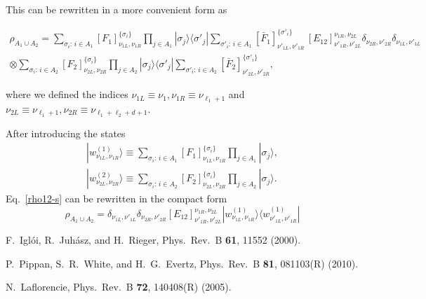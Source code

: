 \documentclass[twocolumn,superscriptaddress,prb,10pt]{revtex4-1}
\begin{document}
%
This can be rewritten in a more convenient form as 
%
\begin{widetext}
\begin{multline}
\label{rho12-s}
\rho_{A_1\cup A_2}=\sum_{\sigma_i:\, i\in A_1}
[F_1]^{\{\sigma_i\}}_{\nu_{1L},\nu_{1R}}\prod_{j\in A_1}|\sigma_j\rangle
\langle\sigma'_j|\sum_{\sigma'_i:\, i\in A_1}
[\bar F_1]^{\{\sigma'_i\}}_{\nu'_{1L},\nu'_{1R}}\,
[E_{12}]^{\nu_{1R},\nu_{2L}}_{\nu'_{1R},\nu'_{2L}}
\delta_{\nu_{2R},
\nu'_{2R}}\delta_{\nu_{1L},\nu'_{1L}}
\\\otimes\sum_{\sigma_i:\, i\in A_2}
[F_2]^{\{\sigma_{i}\}}_{\nu_{2L},
\nu_{2R}}\prod_{j\in A_2}|\sigma_j\rangle\langle\sigma'_j|
\sum_{\sigma'_i:\, i\in A_2}
[\bar F_2]^{\{\sigma'_i\}}_{\nu'_{2L},
\nu'_{2R}},
\end{multline}
\end{widetext}
%
where we defined the indices $\nu_{1L}\equiv\nu_1,\nu_{1R}\equiv\nu_{\ell_1+1}$ 
and $\nu_{2L}\equiv\nu_{\ell_1+1},\nu_{2R}\equiv\nu_{\ell_1+\ell_2+d+1}$. 

After introducing the states
%
\begin{align}
|w^{(1)}_{\nu_{1L},\nu_{1R}}\rangle\equiv\sum\limits_{\sigma_i:\,i\in A_1}
[F_1]^{\{\sigma_i\}}_{\nu_{1L},\nu_{1R}}\prod\limits_{j\in A_1}|\sigma_j\rangle,\\
|w^{(2)}_{\nu_{2L},\nu_{2R}}\rangle\equiv\sum\limits_{\sigma_i:\,i\in A_2}
[F_2]^{\{\sigma_i\}}_{\nu_{2L},\nu_{2R}}\prod\limits_{j\in A_2}|\sigma_j\rangle.
\end{align}
%
Eq.~\eqref{rho12-s} can be rewritten in the compact form  
%
\begin{equation}
\rho_{A_1\cup A_2}=\delta_{\nu_{1L},\nu'_{1L}}\delta_{\nu_{2R},\nu'_{2R}}
[E_{12}]^{\nu_{1R},\nu_{2L}}_{\nu'_{1R},\nu'_{2L}}|w^{(1)}_{\nu_{1L},\nu_{1R}}
\rangle\langle w^{(1)}_{\nu'_{1L},\nu'_{1R}}|
\end{equation}
%


\begin{thebibliography}{99}


F.~Igl\'oi, R.~Juh\'asz, and H.~Rieger, Phys.\ Rev.\ B {\bf 61}, 11552 (2000).

P.~Pippan, S.~R.~White, and H.~G.~Evertz, Phys.\ Rev.\ B {\bf 81}, 081103(R) 
(2010). 

N.~Laflorencie, Phys.\ Rev.\ B {\bf 72}, 140408(R) (2005). 

\end{thebibliography}
\end{document}
